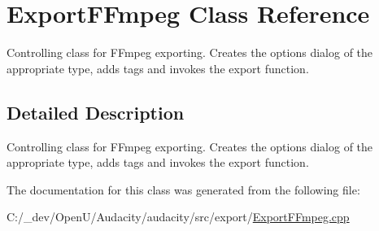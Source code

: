 \hypertarget{class_export_f_fmpeg}{}\section{Export\+F\+Fmpeg Class Reference}
\label{class_export_f_fmpeg}


Controlling class for F\+Fmpeg exporting. Creates the options dialog of the appropriate type, adds tags and invokes the export function.  




\subsection{Detailed Description}
Controlling class for F\+Fmpeg exporting. Creates the options dialog of the appropriate type, adds tags and invokes the export function. 

The documentation for this class was generated from the following file\+:\begin{DoxyCompactItemize}
\item 
C\+:/\+\_\+dev/\+Open\+U/\+Audacity/audacity/src/export/\hyperlink{_export_f_fmpeg_8cpp}{Export\+F\+Fmpeg.\+cpp}\end{DoxyCompactItemize}
